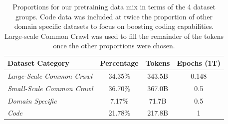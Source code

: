 \documentclass[10pt]{article} %
\begin{document}
\begin{table}
    \centering
    \small
    \begin{tabular}{l c c c} \toprule 
         \textbf{Dataset Category} & \textbf{Percentage} & \textbf{Tokens} & \textbf{Epochs (1T)}  \\ 
         \midrule
         \textit{Large-Scale Common Crawl} & 34.35\% & 343.5B & 0.148  \\
         \textit{Small-Scale Common Crawl} & 36.70\% & 367.0B & 0.5  \\
         \textit{Domain Specific} & 7.17\% & 71.7B & 0.5  \\
         \textit{Code} & 21.78\% & 217.8B & 1 \\
         \bottomrule
    \end{tabular}
    \caption{Proportions for our pretraining data mix in terms of the 4 dataset groups. Code data was included at twice the proportion of other domain specific datasets to focus on boosting coding capabilities.  Large-scale Common Crawl was used to fill the remainder of the tokens once the other proportions were chosen.}
    \label{tab:pretrain-data-proportions}
\end{table}
\end{document}
